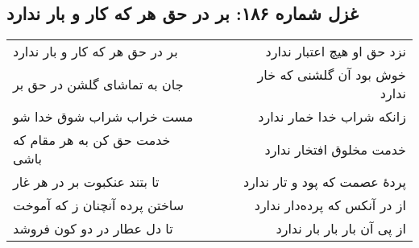 \begin{center}
\section*{غزل شماره ۱۸۶: بر در حق هر که کار و بار ندارد}
\label{sec:186}
\begin{longtable}{l p{0.5cm} r}
بر در حق هر که کار و بار ندارد
&&
نزد حق او هیچ اعتبار ندارد
\\
جان به تماشای گلشن در حق بر
&&
خوش بود آن گلشنی که خار ندارد
\\
مست خراب شراب شوق خدا شو
&&
زانکه شراب خدا خمار ندارد
\\
خدمت حق کن به هر مقام که باشی
&&
خدمت مخلوق افتخار ندارد
\\
تا بتند عنکبوت بر در هر غار
&&
پردهٔ عصمت که پود و تار ندارد
\\
ساختن پرده آنچنان ز که آموخت
&&
از در آنکس که پرده‌دار ندارد
\\
تا دل عطار در دو کون فروشد
&&
از پی آن بار بار بار ندارد
\\
\end{longtable}
\end{center}
